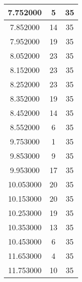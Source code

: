\begin{longtable}[htbp]{|c|c|c|}
7.752000 & 5 & 35 \\ \hline
7.852000 & 14 & 35 \\ \hline
7.952000 & 19 & 35 \\ \hline
8.052000 & 23 & 35 \\ \hline
8.152000 & 23 & 35 \\ \hline
8.252000 & 23 & 35 \\ \hline
8.352000 & 19 & 35 \\ \hline
8.452000 & 14 & 35 \\ \hline
8.552000 & 6 & 35 \\ \hline
9.753000 & 1 & 35 \\ \hline
9.853000 & 9 & 35 \\ \hline
9.953000 & 17 & 35 \\ \hline
10.053000 & 20 & 35 \\ \hline
10.153000 & 20 & 35 \\ \hline
10.253000 & 19 & 35 \\ \hline
10.353000 & 13 & 35 \\ \hline
10.453000 & 6 & 35 \\ \hline
11.653000 & 4 & 35 \\ \hline
11.753000 & 10 & 35 \\ \hline
\end{longtable}
